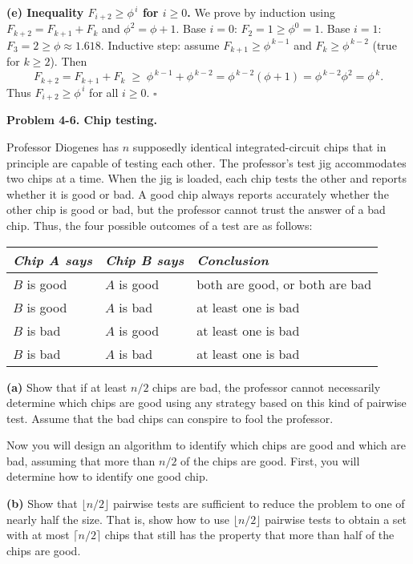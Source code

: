 \documentclass[12pt]{article}
\theoremstyle{definition}
\begin{document}
\medskip
\noindent\textbf{(e) Inequality $F_{i+2}\ge \phi^{\,i}$ for $i\ge0$.}
We prove by induction using $F_{k+2}=F_{k+1}+F_k$ and $\phi^2=\phi+1$.
Base $i=0$: $F_2=1\ge \phi^0=1$.  
Base $i=1$: $F_3=2\ge \phi\approx1.618$.  
Inductive step: assume $F_{k+1}\ge \phi^{\,k-1}$ and $F_{k}\ge \phi^{\,k-2}$ (true for $k\ge2$). Then
\[
F_{k+2}=F_{k+1}+F_k \;\ge\; \phi^{\,k-1}+\phi^{\,k-2}
=\phi^{\,k-2}(\phi+1)=\phi^{\,k-2}\phi^2=\phi^{\,k}.
\]
Thus $F_{i+2}\ge \phi^{\,i}$ for all $i\ge0$.
\hfill$\square$

\newpage

\noindent\textbf{Problem 4-6. Chip testing.}

\medskip
Professor Diogenes has $n$ supposedly identical integrated-circuit chips that in principle are capable of testing each other. The professor’s test jig accommodates two chips at a time. When the jig is loaded, each chip tests the other and reports whether it is good or bad. A good chip always reports accurately whether the other chip is good or bad, but the professor cannot trust the answer of a bad chip. Thus, the four possible outcomes of a test are as follows:

\begin{center}
\begin{tabular}{l l l}
\textit{Chip A says} & \textit{Chip B says} & \textit{Conclusion}\\ \hline
$B$ is good & $A$ is good & both are good, or both are bad\\
$B$ is good & $A$ is bad & at least one is bad\\
$B$ is bad  & $A$ is good & at least one is bad\\
$B$ is bad  & $A$ is bad  & at least one is bad
\end{tabular}
\end{center}

\noindent\textbf{(a)} Show that if at least $n/2$ chips are bad, the professor cannot necessarily determine which chips are good using any strategy based on this kind of pairwise test. Assume that the bad chips can conspire to fool the professor.

\smallskip
Now you will design an algorithm to identify which chips are good and which are bad, assuming that more than $n/2$ of the chips are good. First, you will determine how to identify one good chip.

\noindent\textbf{(b)} Show that $\lfloor n/2\rfloor$ pairwise tests are sufficient to reduce the problem to one of nearly half the size. That is, show how to use $\lfloor n/2\rfloor$ pairwise tests to obtain a set with at most $\lceil n/2\rceil$ chips that still has the property that more than half of the chips are good.
\end{document}
